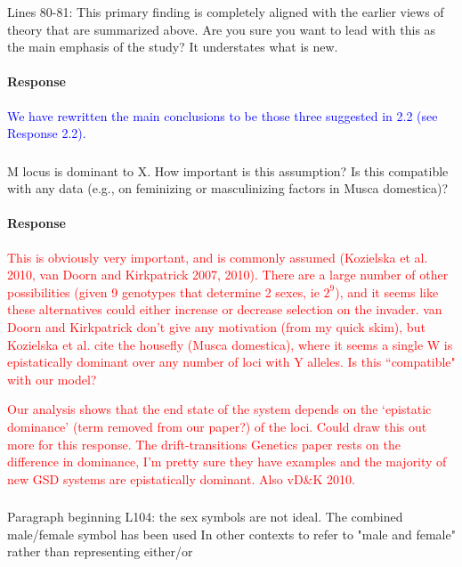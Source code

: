 \documentclass[10pt,letterpaper]{article}
\begin{document}
\noindent\subsubsection{}
Lines 80-81: This primary finding is completely aligned with the earlier views of theory that are summarized above. Are you sure you want to lead with this as the main emphasis of the study? It understates what is new.

\noindent\paragraph{Response}
\textcolor{blue}{We have rewritten the main conclusions to be those three suggested in 2.2 (see Response 2.2).}

\noindent\subsubsection{}
M locus is dominant to X. How important is this assumption? Is this compatible with any data (e.g., on feminizing or masculinizing factors in Musca domestica)?

\noindent\paragraph{Response}
\textcolor{red}{This is obviously very important, and is commonly assumed (Kozielska et al. 2010, van Doorn and Kirkpatrick 2007, 2010). There are a large number of other possibilities (given 9 genotypes that determine 2 sexes, ie $2^9$), and it seems like these alternatives could either increase or decrease selection on the invader. van Doorn and Kirkpatrick don't give any motivation (from my quick skim), but Kozielska et al. cite the housefly (Musca domestica), where it seems a single W is epistatically dominant over any number of loci with Y alleles. Is this ``compatible" with our model?}

\textcolor{red}{Our analysis shows that the end state of the system depends on the `epistatic dominance' (term removed from our paper?) of the loci. Could draw this out more for this response. The drift-transitions Genetics paper rests on the difference in dominance, I'm pretty sure they have examples and the majority of new GSD systems are epistatically dominant. Also vD\&K 2010. }

\noindent\subsubsection{}
Paragraph beginning L104: the sex symbols are not ideal. The combined male/female symbol has been used In other contexts to refer to "male and female" rather than representing either/or
\end{document}
